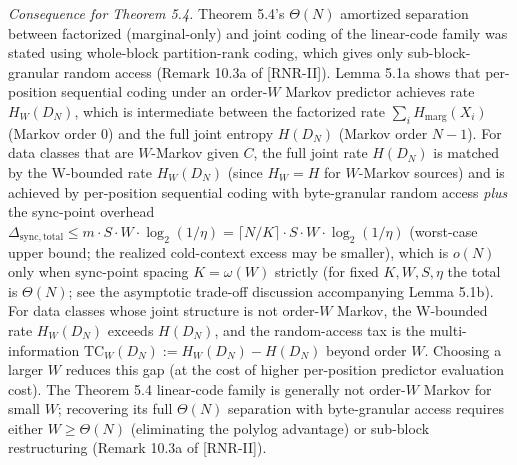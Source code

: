 \documentclass[
]{article}
\begin{document}
\emph{Consequence for Theorem 5.4.} Theorem 5.4's $\Theta(N)$
amortized separation between factorized (marginal-only) and joint
coding of the linear-code family was stated using whole-block
partition-rank coding, which gives only sub-block-granular random
access (Remark 10.3a of [RNR-II]). Lemma 5.1a shows that per-position sequential
coding under an order-$W$ Markov predictor achieves rate
$H_W(D_N)$, which is intermediate between the factorized rate
$\sum_i H_{\mathrm{marg}}(X_i)$ (Markov order 0) and the full joint
entropy $H(D_N)$ (Markov order $N-1$). For data classes that are
$W$-Markov given $C$, the full joint rate $H(D_N)$ is matched by the
W-bounded rate $H_W(D_N)$ (since $H_W = H$ for $W$-Markov sources)
and is achieved by per-position sequential coding with byte-granular
random access \emph{plus} the sync-point overhead
$\Delta_{\mathrm{sync,total}} \leq m \cdot S \cdot W \cdot \log_2(1/\eta)
= \lceil N/K \rceil \cdot S \cdot W \cdot \log_2(1/\eta)$ (worst-case
upper bound; the realized cold-context excess may be smaller), which is
$o(N)$ only when sync-point spacing $K = \omega(W)$ strictly (for
fixed $K, W, S, \eta$ the total is $\Theta(N)$; see the asymptotic
trade-off discussion accompanying Lemma 5.1b). For
data classes whose joint structure is not order-$W$ Markov, the
W-bounded rate $H_W(D_N)$ exceeds $H(D_N)$, and the
random-access tax is the multi-information $\mathrm{TC}_W(D_N) :=
H_W(D_N) - H(D_N)$ beyond order $W$. Choosing a larger $W$ reduces
this gap (at the cost of higher per-position predictor evaluation
cost). The Theorem 5.4 linear-code family is generally not order-$W$
Markov for small $W$; recovering its full $\Theta(N)$ separation with
byte-granular access requires either $W \geq \Theta(N)$ (eliminating
the polylog advantage) or sub-block restructuring (Remark 10.3a of [RNR-II]).
\end{document}
